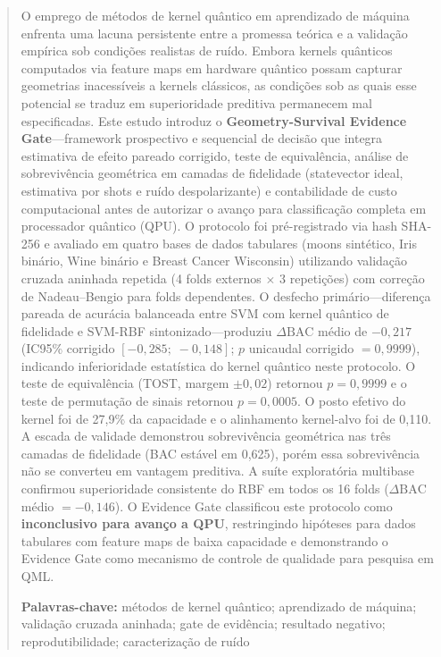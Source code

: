 \documentclass[11pt,a4paper]{article}
\newcommand{\BAC}{\mathrm{BAC}}
\begin{document}
\begin{abstract}
O emprego de m\'etodos de kernel qu\^antico em aprendizado de m\'aquina enfrenta
uma lacuna persistente entre a promessa te\'orica e a valida\c{c}\~ao
emp\'irica sob condi\c{c}\~oes realistas de ru\'ido. Embora kernels qu\^anticos
computados via feature maps em hardware qu\^antico possam capturar
geometrias inacess\'iveis a kernels cl\'assicos, as condi\c{c}\~oes sob as
quais esse potencial se traduz em superioridade preditiva permanecem mal
especificadas. Este estudo introduz o \textbf{Geometry-Survival Evidence
Gate}---framework prospectivo e sequencial de decis\~ao que integra
estimativa de efeito pareado corrigido, teste de equival\^encia, an\'alise de
sobreviv\^encia geom\'etrica em camadas de fidelidade (statevector ideal,
estimativa por shots e ru\'ido despolarizante) e contabilidade de custo
computacional antes de autorizar o avan\c{c}o para classifica\c{c}\~ao
completa em processador qu\^antico (QPU). O protocolo foi pr\'e-registrado via
hash SHA-256 e avaliado em quatro bases de dados tabulares (moons sint\'etico,
Iris bin\'ario, Wine bin\'ario e Breast Cancer Wisconsin) utilizando
valida\c{c}\~ao cruzada aninhada repetida (4 folds externos $\times$ 3
repeti\c{c}\~oes) com corre\c{c}\~ao de Nadeau--Bengio para folds dependentes.
O desfecho prim\'ario---diferen\c{c}a pareada de acur\'acia balanceada entre
SVM com kernel qu\^antico de fidelidade e SVM-RBF sintonizado---produziu
$\Delta\BAC$ m\'edio de $-0{,}217$ (IC95\% corrigido $[-0{,}285;\;
-0{,}148]$; $p$ unicaudal corrigido $= 0{,}9999$), indicando inferioridade
estat\'istica do kernel qu\^antico neste protocolo. O teste de equival\^encia
(TOST, margem $\pm 0{,}02$) retornou $p = 0{,}9999$ e o teste de
permuta\c{c}\~ao de sinais retornou $p = 0{,}0005$. O posto efetivo do kernel
foi de 27,9\% da capacidade e o alinhamento kernel-alvo foi de 0,110. A escada
de validade demonstrou sobreviv\^encia geom\'etrica nas tr\^es camadas de
fidelidade (BAC est\'avel em 0,625), por\'em essa sobreviv\^encia n\~ao se
converteu em vantagem preditiva. A su\'ite explorat\'oria multibase confirmou
superioridade consistente do RBF em todos os 16 folds ($\Delta\BAC$ m\'edio
$= -0{,}146$). O Evidence Gate classificou este protocolo como
\textbf{inconclusivo para avan\c{c}o a QPU}, restringindo hip\'oteses para
dados tabulares com feature maps de baixa capacidade e demonstrando o Evidence
Gate como mecanismo de controle de qualidade para pesquisa em QML.

\medskip
\noindent\textbf{Palavras-chave:} m\'etodos de kernel qu\^antico; aprendizado
de m\'aquina; valida\c{c}\~ao cruzada aninhada; gate de evid\^encia; resultado
negativo; reprodutibilidade; caracteriza\c{c}\~ao de ru\'ido
\end{abstract}
\end{document}
